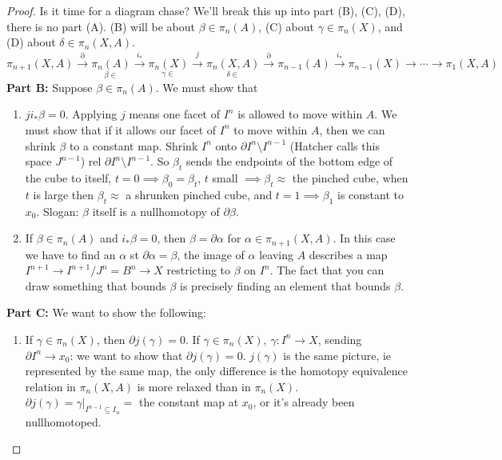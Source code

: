 \begin{proof}
    Is it time for a diagram chase? We'll break this up into part (B), (C), (D), there is no part (A). (B) will be about $\beta \in \pi_n (A)$, (C) about $\gamma \in \pi_n (X)$, and (D) about $\delta \in \pi_n (X,A)$.
\[
                \pi_{n+1}(X,A)\overset{\partial }{\longrightarrow}  \underset{\beta \in }{\pi_n (A)}  \overset{i_*}{\longrightarrow} \underset{\gamma\in }{\pi_n (X)} \overset{j}{\longrightarrow}  \underset{\delta\in }{\pi_n (X,A)}  \overset{\partial }{\longrightarrow}  \pi_{n-1}(A) \overset{i_*}{\longrightarrow} \pi_{n-1}(X)\to \cdots \to \pi_1(X,A)
            \]
    \noindent\textbf{Part B:} Suppose $\beta \in \pi_n (A)$. We must show that
    \begin{enumerate}[label=(\roman*)]
        \item $ji_*\beta =0$. Applying $j$ means one facet of $I^n $ is allowed to move within $A$. We must show that if it allows our facet of $I^n $ to move within $A$, then we can shrink $\beta $ to a constant map. Shrink $I^n $ onto $\partial I^n \setminus I^{n-1}$ (Hatcher calls this space $J^{n-1}$) rel $\partial I^n \setminus I^{n-1}$. So $\beta_t $ sends the endpoints of the bottom edge of the cube to itself, $t=0\implies \beta_0=\beta _t$, $t$ small $\implies \beta _t\approx$ the pinched cube, when $t$ is large then $\beta _t\approx$ a shrunken pinched cube, and $t=1\implies \beta_1 $ is constant to $x_0$. Slogan: $\beta $ itself is a nullhomotopy of $\partial \beta $.
        \item If $\beta \in \pi_n (A)$ and $i_*\beta =0$, then $\beta =\partial \alpha $ for $\alpha \in \pi_{n+1}(X,A)$. In this case we have to find an $\alpha $ st $\partial \alpha =\beta $, the image of $\alpha $ leaving $A$ describes a map $I^{n+1}\to  I^{n+1}/J^n =B^n \to X$ restricting to $\beta $ on $I^n $. The fact that you can draw something that bounds $\beta $ is precisely finding an element that bounds $\beta $.
    \end{enumerate}
    \noindent\textbf{Part C:} We want to show the following:
    \begin{enumerate}[label=(\roman*)]
        \item If $\gamma \in \pi_n (X)$, then $\partial j(\gamma)=0$. If $\gamma \in \pi_n (X)$, $\gamma \colon I^n  \to X$, sending $\partial I^n  \to x_0$: we want to show that $\partial  j(\gamma)=0$. $j(\gamma)$ is the same picture, ie represented by the same map, the only difference is the homotopy equivalence relation in $\pi_n (X,A)$ is more relaxed than in $\pi_n (X)$. $\partial j(\gamma)= \left. \gamma \right| _{I^{n-1}\subseteq I_n }=$ the constant map at $x_0$, or it's already been nullhomotoped.

\end{enumerate}
\end{proof}

